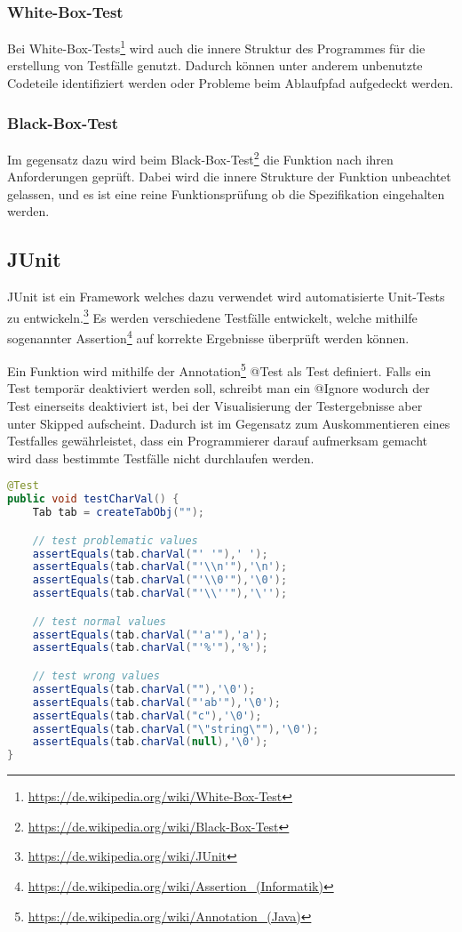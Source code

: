 \subsubsection{White-Box-Test}

Bei White-Box-Tests\footnote{\url{https://de.wikipedia.org/wiki/White-Box-Test}} wird auch die innere Struktur des Programmes f\"ur die erstellung von Testf\"alle genutzt. Dadurch k\"onnen unter anderem unbenutzte Codeteile identifiziert werden oder Probleme beim Ablaufpfad aufgedeckt werden. 

\subsubsection{Black-Box-Test}

Im gegensatz dazu wird beim Black-Box-Test\footnote{\url{https://de.wikipedia.org/wiki/Black-Box-Test}} die Funktion nach ihren Anforderungen gepr\"uft. Dabei wird die innere Strukture der Funktion unbeachtet gelassen, und es ist eine reine Funktionspr\"ufung ob die Spezifikation eingehalten werden.

\newpage
\subsection{JUnit}

JUnit ist ein Framework welches dazu verwendet wird automatisierte Unit-Tests zu entwickeln.\footnote{\url{https://de.wikipedia.org/wiki/JUnit}} Es werden verschiedene Testf\"alle entwickelt, welche mithilfe sogenannter Assertion\footnote{\url{https://de.wikipedia.org/wiki/Assertion_(Informatik)}} auf korrekte Ergebnisse \"uberpr\"uft werden k\"onnen.

Ein Funktion wird mithilfe der Annotation\footnote{\url{https://de.wikipedia.org/wiki/Annotation_(Java)}}  @Test als Test definiert. Falls ein Test tempor\"ar deaktiviert werden soll, schreibt man ein @Ignore wodurch der Test einerseits deaktiviert ist, bei der Visualisierung der Testergebnisse aber unter Skipped aufscheint. Dadurch ist im Gegensatz zum Auskommentieren eines Testfalles gew\"ahrleistet, dass ein Programmierer darauf aufmerksam gemacht wird dass bestimmte Testf\"alle nicht durchlaufen werden.

\begin{lstlisting}[language=Java]
@Test
public void testCharVal() {
	Tab tab = createTabObj("");

	// test problematic values
	assertEquals(tab.charVal("' '"),' ');
	assertEquals(tab.charVal("'\\n'"),'\n');
	assertEquals(tab.charVal("'\\0'"),'\0');
	assertEquals(tab.charVal("'\\''"),'\'');

	// test normal values
	assertEquals(tab.charVal("'a'"),'a');
	assertEquals(tab.charVal("'%'"),'%');

	// test wrong values
	assertEquals(tab.charVal(""),'\0');
	assertEquals(tab.charVal("'ab'"),'\0');
	assertEquals(tab.charVal("c"),'\0');
	assertEquals(tab.charVal("\"string\""),'\0');
	assertEquals(tab.charVal(null),'\0');
}
\end{lstlisting}

